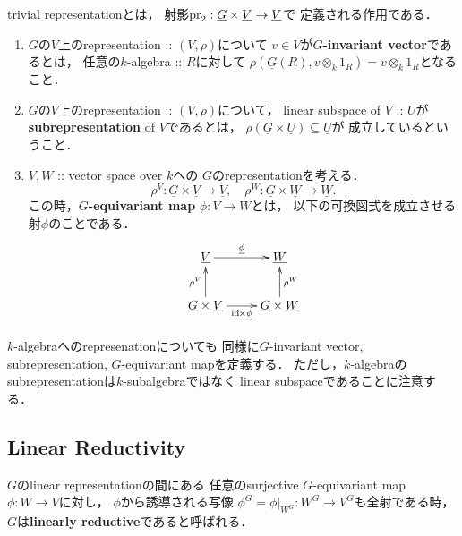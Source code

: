 \documentclass[a4paper]{jsarticle}
\newcommand{\func}[1]{\underline{#1}}
\begin{document}
    \begin{Example}
        trivial representationとは，
        射影$\pr_2: \func{G} \times \func{V} \to \func{V}$で
        定義される作用である．
    \end{Example}

    \begin{Def}
    \begin{enumerate}[label=(\roman*), leftmargin=*]
    \item 
        $G$の$V$上のrepresentation :: $(V, \rho)$について
        $v \in V$が\textbf{$G$-invariant vector}であるとは，
        任意の$k$-algebra :: $R$に対して
        $\rho(\func{G}(R), v \otimes_k 1_R)=v \otimes_k 1_R$となること．

    \item
        $G$の$V$上のrepresentation :: $(V, \rho)$について，
        linear subspace of $V$ :: $U$が
        \textbf{subrepresentation} of $V$であるとは，
        $\rho(\func{G} \times \func{U}) \subseteq \func{U}$が
        成立しているということ．

    \item
        $V, W$ :: vector space over $k$への
        $G$のrepresentationを考える．
        \[
            \rho^V: \func{G} \times \func{V} \to \func{V}, \quad
            \rho^W: \func{G} \times \func{W} \to \func{W}.
        \]
        この時，\textbf{$G$-equivariant map} $\phi: V \to W$とは，
        以下の可換図式を成立させる射$\phi$のことである．
        \[
        \xymatrix
        {
            \func{V} \ar[r]^-{\func{\phi}}& \func{W} \\
            \func{G} \times \func{V} \ar[u]^-{\rho^V} \ar[r]_-{\id \times \func{\phi}}&
            \func{G} \times \func{W} \ar[u]_-{\rho^W}
        }
        \]
    \end{enumerate}
    $k$-algebraへのrepresenationについても
    同様に$G$-invariant vector, subrepresentation, $G$-equivariant mapを定義する．
    ただし，$k$-algebraのsubrepresentationは$k$-subalgebraではなく
    linear subspaceであることに注意する．
    \end{Def}

    \subsection{Linear Reductivity}
    \begin{Def}
        $G$のlinear representationの間にある
        任意のsurjective $G$-equivariant map $\phi: W \to V$に対し，
        $\phi$から誘導される写像
        $\phi^G=\phi|_{W^G}: W^G \to V^G$も全射である時，
        $G$は\textbf{linearly reductive}であると呼ばれる．
    \end{Def}
\end{document}
